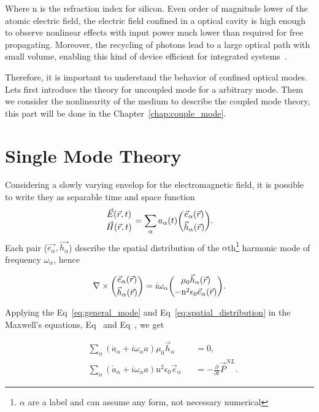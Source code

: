 Where $\text{n}$ is the refraction index for silicon. Even order of magnitude lower of the atomic electric field, the electric field confined in a optical cavity is high enough to observe nonlinear effects with input power much lower than required for free propagating\needcit. Moreover, the recycling of photons lead to a large optical path with small volume, enabling this kind of device efficient for integrated systems~\needcit.  

Therefore, it is important to understand the behavior of confined optical modes. Lets first introduce the theory for uncoupled mode for a arbitrary mode. Them we consider the nonlinearity of the medium to describe the coupled mode theory, this part will be done in the Chapter~\ref{chap:couple_mode}. 

\section{Single Mode Theory}

Considering a slowly varying envelop for the electromagnetic field, it is possible to write they as separable time and space function
\begin{equation}
    \genfrac{}{}{0 pt}{}{\vec{E}(\vec{r},t)}{\vec{H}(\vec{r},t)} = \sum_\alpha a_\alpha(t)\genfrac{(}{)}{0 pt}{}{\vec{e}_\alpha(\vec{r})}{\vec{h}_\alpha(\vec{r})}.
    \label{eq:general_mode}
\end{equation}
Each pair ($\vec{e_\alpha},\vec{h_\alpha}$) describe the spatial distribution of the $\alpha$th\footnote{$\alpha$ are a label and can assume any form, not necessary numerical} harmonic mode of frequency $\omega_\alpha$, hence 

\begin{equation}
    \nabla \times \genfrac{(}{)}{0 pt}{}{\vec{e}_\alpha(\vec{r})}{\vec{h}_\alpha(\vec{r})} = i\omega_\alpha \genfrac{(}{)}{0 pt}{}{\mu_0\vec{h}_\alpha(\vec{r})}{-\n^2\epsilon_0\vec{e}_\alpha(\vec{r})}.
    \label{eq:spatial_distribution}
\end{equation}

Applying the Eq~\ref{eq:general_mode} and Eq~\ref{eq:spatial_distribution} in the Maxwell's equations, Eq~ and Eq~, we get

\begin{subequations}
    \begin{alignat}{2}
        &\sum_\alpha \left(\dot{a}_\alpha + i \omega_\alpha a\right) \mu_0 \vec{h}_\alpha &&= 0,\\
        &\sum_\alpha \left(\dot{a}_\alpha + i \omega_\alpha a\right) \text{n}^2\epsilon_0 \vec{e}_\alpha &&= -\frac{\partial}{\partial t}\vec{P}^{NL}.
    \end{alignat}
\end{subequations}

